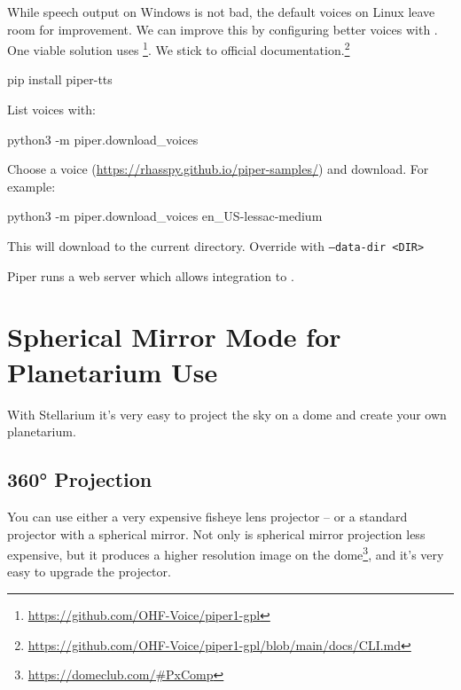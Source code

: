 While speech output on Windows is not bad, the default voices on Linux leave room for improvement. 
We can improve this by configuring better voices with . 
One viable solution uses \footnote{\url{https://github.com/OHF-Voice/piper1-gpl}}. 
We stick to official documentation.\footnote{\url{https://github.com/OHF-Voice/piper1-gpl/blob/main/docs/CLI.md}}

\begin{commands}
pip install piper-tts
\end{commands}

List voices with:

\begin{commands}
python3 -m piper.download_voices
\end{commands}

Choose a voice (\url{https://rhasspy.github.io/piper-samples/}) and download. For example:

\begin{commands}
python3 -m piper.download_voices en_US-lessac-medium
\end{commands}

This will download to the current directory. Override with \texttt{--data-dir <DIR>}

Piper runs a web server which allows integration to .

\fi




\section{Spherical Mirror Mode for Planetarium Use}
\label{sec:CommandLineOptions:SphericalMirror}

With Stellarium it’s very easy to project the sky on a dome and create your own planetarium.

\subsection{360° Projection}
You can use either a very expensive fisheye lens projector -- or a standard projector with a spherical mirror.
Not only is spherical mirror projection less expensive, 
but it produces a higher resolution image on the dome\footnote{\url{https://domeclub.com/#PxComp}},
and it's very easy to upgrade the projector.

